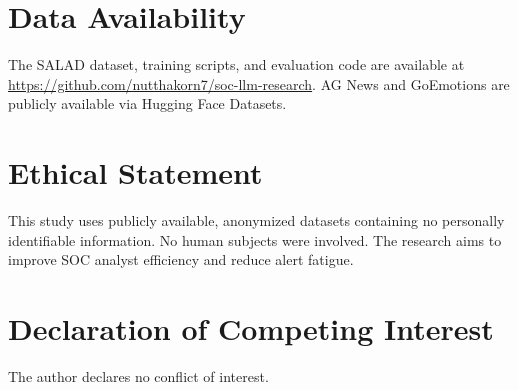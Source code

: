 \documentclass[journal]{IEEEtran}
\begin{document}
\section*{Data Availability}
The SALAD dataset, training scripts, and evaluation code are available at \url{https://github.com/nutthakorn7/soc-llm-research}. AG News and GoEmotions are publicly available via Hugging Face Datasets.

\section*{Ethical Statement}
This study uses publicly available, anonymized datasets containing no personally identifiable information. No human subjects were involved. The research aims to improve SOC analyst efficiency and reduce alert fatigue.

\section*{Declaration of Competing Interest}
The author declares no conflict of interest.
\end{document}
